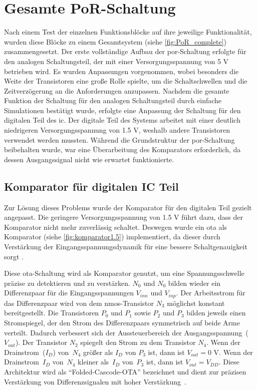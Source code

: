 \section{Gesamte PoR-Schaltung}
Nach einem Test der einzelnen Funktionsblöcke auf ihre jeweilige Funktionalität, wurden diese Blöcke zu einem Gesamtsystem (siehe \ref{fig:PoR_complete}) zusammengesetzt. Der erste vollständige Aufbau der \gls{por}-Schaltung erfolgte für den analogen Schaltungsteil, der mit einer Versorgungsspannung von 5 V betrieben wird. Es wurden Anpassungen vorgenommen, wobei besonders die Weite der Transistoren eine große Rolle spielte, um die Schaltschwellen und die Zeitverzögerung an die Anforderungen anzupassen. Nachdem die gesamte Funktion der Schaltung für den analogen Schaltungsteil durch einfache Simulationen bestätigt wurde, erfolgte eine Anpassung der Schaltung für den digitalen Teil des \gls{ic}. Der digitale Teil des Systems arbeitet mit einer deutlich niedrigeren Versorgungsspannung von 1.5 V, weshalb andere Transistoren verwendet werden mussten. Während die Grundstruktur der \gls{por}-Schaltung beibehalten wurde, war eine Überarbeitung des Komparators erforderlich, da dessen Ausgangssignal nicht wie erwartet funktionierte.

\subsection{Komparator für digitalen IC Teil}
Zur Lösung dieses Problems wurde der Komparator für den digitalen Teil gezielt angepasst. Die geringere Versorgungsspannung von 1.5 V führt dazu, dass der Komparator nicht mehr zuverlässig schaltet. Deswegen wurde ein \gls{ota} als Komparator (siehe \autoref{fig:komparator1.5}) implementiert, da dieser durch Verstärkung der Eingangsspannungsdynamik für eine bessere Schaltgenauigkeit sorgt \cite{CMOS_Analog_Circuit_Design}. 

Diese \gls{ota}-Schaltung wird als Komparator genutzt, um eine Spannungsschwelle präzise zu detektieren und zu verstärken. $N_0$ und $N_0$ bilden wieder ein Differenzpaar für die Eingangsspannungen $V_{inn}$ und $V_{inp}$. Der Arbeitsstrom für das Differenzpaar wird von dem \gls{nmos}-Transistor $N_3$ möglichst konstant bereitgestellt. Die Transistoren $P_0$ und $P_1$ sowie $P_2$ und $P_3$ bilden jeweils einen Stromspiegel, der den Strom des Differenzpaars symmetrisch auf beide Arme verteilt. Dadurch verbessert sich der Aussteuerbereich der Ausgangsspannung~($V_{out}$). Der Transistor $N_2$ spiegelt den Strom zu dem Transistor $N_4$. Wenn der Drainstrom~($I_D$) von~$N_4$ größer als $I_D$ von $P_3$ ist, dann ist $V_{out} = 0$ V. Wenn der Drainstrom~{$I_D$} von~$N_4$ kleiner als~$I_D$ von~$P_3$ ist, dann ist $V_{out} = V_{DD}$. Diese Architektur wird als \enquote{Folded-Cascode-OTA} bezeichnet und dient zur präzisen Verstärkung von Differenzsignalen mit hoher Verstärkung~\cite{CMOS_Analog_Circuit_Design}\cite{DesignOfAnalogCMOSIntegratedCircuits}.

